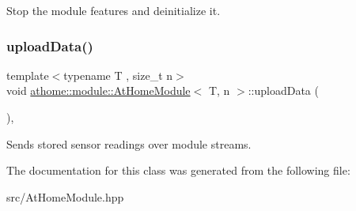 Stop the module features and deinitialize it. \mbox{\label{classathome_1_1module_1_1_at_home_module_a4fd5a07603ff4cb512d201352aa2be0a}} 
\subsubsection{\texorpdfstring{upload\+Data()}{uploadData()}}
{\footnotesize\ttfamily template$<$typename T , size\+\_\+t n$>$ \\
void \mbox{\hyperlink{classathome_1_1module_1_1_at_home_module}{athome\+::module\+::\+At\+Home\+Module}}$<$ T, n $>$\+::upload\+Data (\begin{DoxyParamCaption}{ }\end{DoxyParamCaption})\hspace{0.3cm}{\ttfamily [inline]}, {\ttfamily [protected]}}

Sends stored sensor readings over module streams. 

The documentation for this class was generated from the following file\+:\begin{DoxyCompactItemize}
\item 
src/At\+Home\+Module.\+hpp\end{DoxyCompactItemize}
